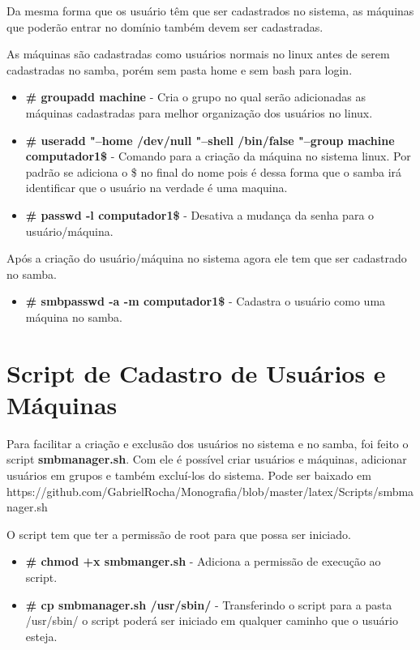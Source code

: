 Da mesma forma que os usuário têm que ser cadastrados no sistema, as máquinas que poderão entrar no domínio também devem ser cadastradas.

As máquinas são cadastradas como usuários normais no linux antes de serem cadastradas no samba, porém sem pasta home e sem bash para login.

\begin{itemize}
	\item \textbf{\# groupadd machine} - Cria o grupo no qual serão adicionadas as máquinas cadastradas para melhor organização dos usuários no linux.
	\item \textbf{\# useradd "--home /dev/null "--shell /bin/false "--group machine computador1\$} - 	Comando para a criação da máquina no sistema linux. Por padrão se adiciona o \$ no final do nome pois é dessa forma que o samba irá identificar que o usuário na verdade é uma maquina. 
	\item \textbf{\# passwd -l computador1\$} - Desativa a mudança da senha para o usuário/máquina.
\end{itemize}

Após a criação do usuário/máquina no sistema agora ele tem que ser cadastrado no samba.

\begin{itemize}	
	\item \textbf{\# smbpasswd -a -m computador1\$} - Cadastra o usuário como uma máquina no samba.
\end{itemize}


\section{Script de Cadastro de Usuários e Máquinas}

Para facilitar a criação e exclusão dos usuários no sistema e no samba, foi feito o script \textbf{smbmanager.sh}. Com ele é possível criar usuários e máquinas, adicionar usuários em grupos e também excluí-los do sistema. Pode ser baixado em https://github.com/GabrielRocha/Monografia/blob/master/latex/Scripts/smbmanager.sh

O script tem que ter a permissão de root para que possa ser iniciado.

\begin{itemize}
	\item \textbf{\# chmod +x smbmanger.sh} - Adiciona a permissão de execução ao script.
	\item \textbf{\# cp smbmanager.sh /usr/sbin/} - Transferindo o script para a pasta /usr/sbin/ o script poderá ser iniciado em qualquer caminho que o usuário esteja.
\end{itemize}

